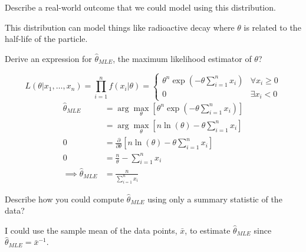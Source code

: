 \documentclass{article}
\begin{document}
\begin{probset}
\begin{prob}
\begin{subprobset}
    \begin{subprob}
        Describe a real-world outcome that we could model using this distribution.

        \begin{soln}
            This distribution can model things like radioactive decay where $\theta$ is related to the half-life of the particle.
        \end{soln}
    \end{subprob}

    \begin{subprob}
        Derive an expression for $\hat{\theta}_{MLE}$, the maximum likelihood estimator of $\theta$?

        \begin{soln}
            \[
                L(\theta | x_1, \dots, x_n) = \prod_{i=1}^n f(x_i|\theta) = \begin{cases} \theta^n \exp \left(-\theta \sum_{i=1}^n x_i\right) & \forall x_i \geq 0 \\ 0 & \exists x_i < 0 \end{cases}
            \]
            \begin{align*}
                \hat{\theta}_{MLE} &= \arg\max_{\theta} \left[ \theta^n \exp \left(-\theta \sum_{i=1}^n x_i\right) \right] \\
                &= \arg\max_{\theta} \left[ n\ln(\theta) - \theta \sum_{i=1}^n x_i \right] \\
                0 &= \frac{\partial}{\partial \theta} \left[ n\ln(\theta) - \theta \sum_{i=1}^n x_i \right] \\
                0 &= \frac{n}{\theta} - \sum_{i=1}^n x_i \\
                \implies \hat{\theta}_{MLE} &= \frac{n}{\sum_{i=1}^n x_i}
            \end{align*}
        \end{soln}
    \end{subprob}

    \begin{subprob}
        Describe how you could compute $\hat{\theta}_{MLE}$ using only a summary statistic of the data?

        \begin{soln}
            I could use the sample mean of the data points, $\bar{x}$, to estimate $\hat{\theta}_{MLE}$ since $\hat{\theta}_{MLE} = \bar{x}^{-1}$.
        \end{soln}
    \end{subprob}


\end{subprobset}
\end{prob}
\end{probset}
\end{document}
